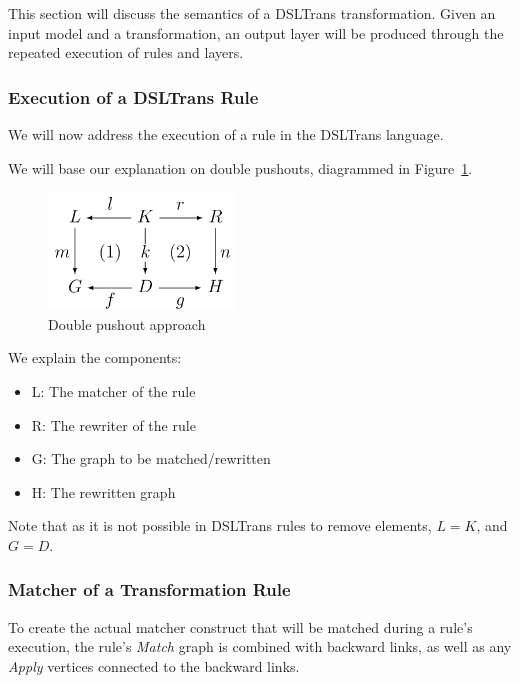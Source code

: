 This section will discuss the semantics of a DSLTrans transformation. Given an input model and a transformation, an output layer will be produced through the repeated execution of rules and layers.




\subsubsection*{Execution of a DSLTrans Rule}

We will now address the execution of a rule in the DSLTrans language. 

We will base our explanation on double pushouts, diagrammed in Figure~\ref{fig:dpo}.

\begin{figure}[h!] \centering
\includegraphics[width=0.44\textwidth]{figures/formal/dpo}
	\caption{Double pushout approach}
	\label{fig:dpo}
\end{figure}

We explain the components:
\begin{itemize}
\item L: The matcher of the rule
\item R: The rewriter of the rule
\item G: The graph to be matched/rewritten
\item H: The rewritten graph
\end{itemize}

Note that as it is not possible in DSLTrans rules to remove elements, $L = K$, and $G = D$.


\subsubsection*{Matcher of a Transformation Rule}

To create the actual matcher construct that will be matched during a rule's execution, the rule's \textit{Match} graph is combined with backward links, as well as any \textit{Apply} vertices connected to the backward links.


